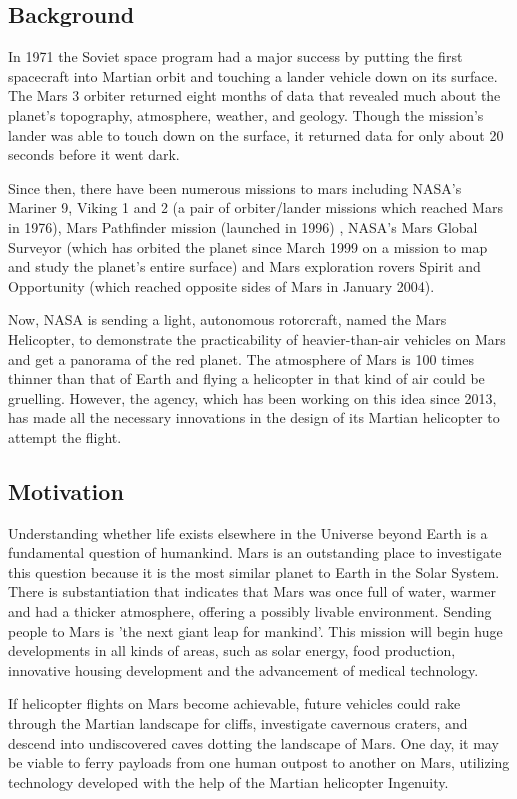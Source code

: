 \documentclass[preprint,12pt]{elsarticle}
\begin{document}
\subsection{\textbf{Background}}

In 1971 the Soviet space program had a major success by putting the first spacecraft into Martian orbit and touching a lander vehicle down on its surface. The Mars 3 orbiter returned eight months of data that revealed much about the planet's topography, atmosphere, weather, and geology. Though the mission's lander was able to touch down on the surface, it returned data for only about 20 seconds before it went dark.\par
Since then, there have been numerous missions to mars including NASA's Mariner 9, Viking 1 and 2 (a pair of orbiter/lander missions which reached Mars in 1976), Mars Pathfinder mission (launched in 1996) , NASA's Mars Global Surveyor (which has orbited the planet since March 1999 on a mission to map and study the planet's entire surface) and Mars exploration rovers Spirit and Opportunity (which reached opposite sides of Mars in January 2004).\par
Now, NASA is sending a light, autonomous rotorcraft, named the Mars Helicopter, to demonstrate the practicability of heavier-than-air vehicles on Mars and get a panorama of the red planet. The atmosphere of Mars is 100 times thinner than that of Earth and flying a helicopter in that kind of air could be gruelling. However, the agency, which has been working on this idea since 2013, has made all the necessary innovations in the design of its Martian helicopter to attempt the flight.\par

\subsection{\textbf{Motivation}}

Understanding whether life exists elsewhere in the Universe beyond Earth is a fundamental question of humankind. Mars is an outstanding place to investigate this question because it is the most similar planet to Earth in the Solar System. There is substantiation that indicates that Mars was once full of water, warmer and had a thicker atmosphere, offering a possibly livable environment. Sending people to Mars is 'the next giant leap for mankind'. This mission will begin huge developments in all kinds of areas, such as solar energy, food production, innovative housing development and the advancement of medical technology.\par
If helicopter flights on Mars become achievable, future vehicles could rake through the Martian landscape for cliffs, investigate cavernous craters, and descend into undiscovered caves dotting the landscape of Mars. One day, it may be viable to ferry payloads from one human outpost to another on Mars, utilizing technology developed with the help of the Martian helicopter Ingenuity. \par
\end{document}
